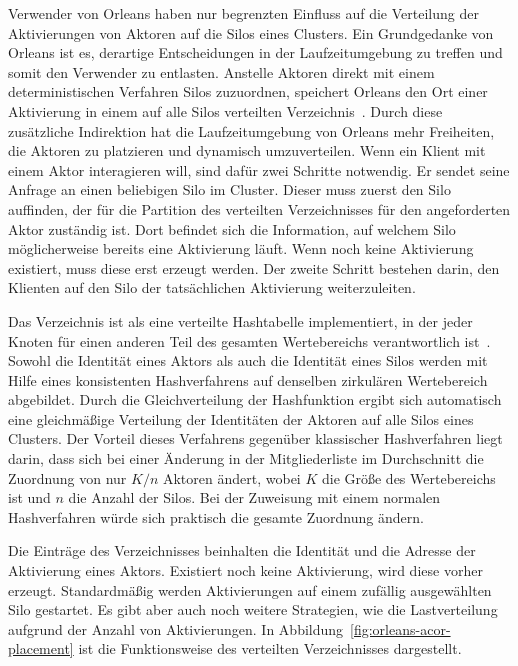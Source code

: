 Verwender von Orleans haben nur begrenzten Einfluss auf die Verteilung der Aktivierungen von Aktoren auf die Silos eines Clusters. Ein Grundgedanke von Orleans ist es, derartige Entscheidungen in der Laufzeitumgebung zu treffen und somit den Verwender zu entlasten. Anstelle Aktoren direkt mit einem deterministischen Verfahren Silos zuzuordnen, speichert Orleans den Ort einer Aktivierung in einem auf alle Silos verteilten Verzeichnis~\cite[5]{virtualActors}. Durch diese zusätzliche Indirektion hat die Laufzeitumgebung von Orleans mehr Freiheiten, die Aktoren zu platzieren und dynamisch umzuverteilen. Wenn ein Klient mit einem Aktor interagieren will, sind dafür zwei Schritte notwendig. Er sendet seine Anfrage an einen beliebigen Silo im Cluster. Dieser muss zuerst den Silo auffinden, der für die Partition des verteilten Verzeichnisses für den angeforderten Aktor zuständig ist. Dort befindet sich die Information, auf welchem Silo möglicherweise bereits eine Aktivierung läuft. Wenn noch keine Aktivierung existiert, muss diese erst erzeugt werden. Der zweite Schritt bestehen darin, den Klienten auf den Silo der tatsächlichen Aktivierung weiterzuleiten.

Das Verzeichnis ist als eine verteilte Hashtabelle implementiert, in der jeder Knoten für einen anderen Teil des gesamten Wertebereichs verantwortlich ist~\cite{Stoica:2001:CSP:383059.383071}. Sowohl die Identität eines Aktors als auch die Identität eines Silos werden mit Hilfe eines konsistenten Hashverfahrens auf denselben zirkulären Wertebereich abgebildet. Durch die Gleichverteilung der Hashfunktion ergibt sich automatisch eine gleichmäßige Verteilung der Identitäten der Aktoren auf alle Silos eines Clusters. Der Vorteil dieses Verfahrens gegenüber klassischer Hashverfahren liegt darin, dass sich bei einer Änderung in der Mitgliederliste im Durchschnitt die Zuordnung von nur $K/n$ Aktoren ändert, wobei $K$ die Größe des Wertebereichs ist und $n$ die Anzahl der Silos. Bei der Zuweisung mit einem normalen Hashverfahren würde sich praktisch die gesamte Zuordnung ändern.

Die Einträge des Verzeichnisses beinhalten die Identität und die Adresse der Aktivierung eines Aktors. Existiert noch keine Aktivierung, wird diese vorher erzeugt. Standardmäßig werden Aktivierungen auf einem zufällig ausgewählten Silo gestartet. Es gibt aber auch noch weitere Strategien, wie \zB die Lastverteilung aufgrund der Anzahl von Aktivierungen. In Abbildung~\ref{fig:orleans-acor-placement} ist die Funktionsweise des verteilten Verzeichnisses dargestellt.

